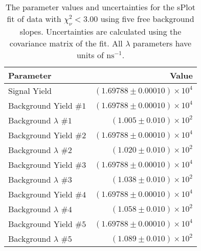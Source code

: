 
\begin{table}[ht]
    \begin{center}
        \begin{tabular}{lr}\toprule
            Parameter & Value \\\midrule
            Signal Yield & $(1.69788 \pm 0.00010) \times 10^{4}$ \\
            Background Yield $\#1$ & $(1.69788 \pm 0.00010) \times 10^{4}$ \\
            Background $\lambda$ $\#1$ & $(1.005 \pm 0.010) \times 10^{2}$ \\
            Background Yield $\#2$ & $(1.69788 \pm 0.00010) \times 10^{4}$ \\
            Background $\lambda$ $\#2$ & $(1.020 \pm 0.010) \times 10^{2}$ \\
            Background Yield $\#3$ & $(1.69788 \pm 0.00010) \times 10^{4}$ \\
            Background $\lambda$ $\#3$ & $(1.038 \pm 0.010) \times 10^{2}$ \\
            Background Yield $\#4$ & $(1.69788 \pm 0.00010) \times 10^{4}$ \\
            Background $\lambda$ $\#4$ & $(1.058 \pm 0.010) \times 10^{2}$ \\
            Background Yield $\#5$ & $(1.69788 \pm 0.00010) \times 10^{4}$ \\
            Background $\lambda$ $\#5$ & $(1.089 \pm 0.010) \times 10^{2}$ \\\bottomrule
        \end{tabular}
        \caption{The parameter values and uncertainties for the sPlot fit of data with $\chi^2_\nu < 3.00$ using five free background slopes. Uncertainties are calculated using the covariance matrix of the fit. All $\lambda$ parameters have units of $\si{\nano\second}^{-1}$.}\label{tab:splot-fit-results-chisqdof-3.00-free-5}
    \end{center}
\end{table}
